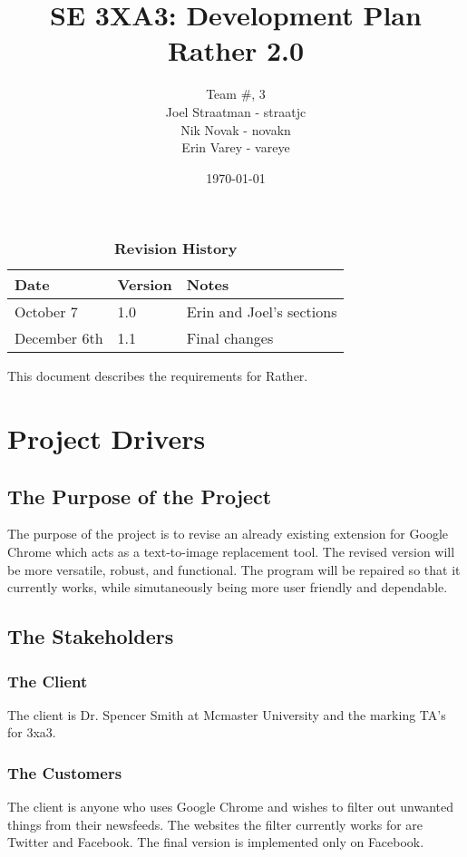 \documentclass[12pt, titlepage]{article}
\title{SE 3XA3: Development Plan\\Rather 2.0}  %
\author{Team \#, 3  %
		\\ Joel Straatman - straatjc
		\\ Nik Novak - novakn
		\\ Erin Varey - vareye
}
\date{\today}
\begin{document}
\maketitle

\tableofcontents
\listoftables
\listoffigures

\begin{table}[bp]
\caption{\bf Revision History}
\begin{tabularx}{\textwidth}{p{3cm}p{2cm}X}
\toprule {\bf Date} & {\bf Version} & {\bf Notes}\\
\midrule
October 7 & 1.0 &  Erin and Joel's sections\\
December 6th & 1.1 & Final changes\\
\bottomrule
\end{tabularx}
\end{table}

\newpage


This document describes the requirements for Rather. 
\section{Project Drivers}

\subsection{The Purpose of the Project}
The purpose of the project is to revise an already existing extension for Google Chrome which acts as a text-to-image replacement tool. The revised version will be more versatile, robust, and functional. The program will be repaired so that it currently works, while simutaneously being more user friendly and dependable. 

\subsection{The Stakeholders}

\subsubsection{The Client}
The client is Dr. Spencer Smith at Mcmaster University and the marking TA's for 3xa3. %

\subsubsection{The Customers}
The client is anyone who uses Google Chrome and wishes to filter out unwanted things from their newsfeeds. The websites the filter currently works for are Twitter and Facebook. The final version is implemented only on Facebook.
\end{document}
